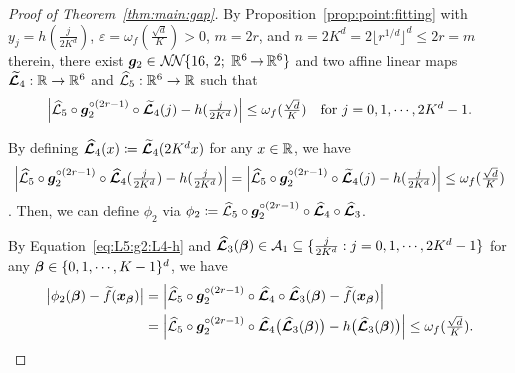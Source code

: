 \documentclass[nohyperref]{article}
\theoremstyle{plain}
\theoremstyle{definition}
\theoremstyle{remark}
\begin{document}
\begin{proof}[Proof of Theorem~\ref{thm:main:gap}]
By Proposition~\ref{prop:point:fitting} with $y_j=h(\tfrac{j}{2K^d})$, $\varepsilon=\omega_f(\tfrac{\sqrt{d}}{K})>0$, $m=2r$, and  $n=2K^d=2\lfloor r^{1/d}\rfloor^d\le 2r=m$ therein, there exist 
$\bmg_2\in\nn{16}{2}{6}{6}$ and two affine linear maps $\bmtildecalL_4:\R\to \R^6$ and $\hatcalL_5:\R^6\to \R$ such that
\begin{equation*}
	\Big|\hatcalL_5\circ \bmg_2^{\circ (2r-1)}\circ \bmtildecalL_4(j)-h(\tfrac{j}{2K^d})\Big|\le \omega_f(\tfrac{\sqrt{d}}{K})\quad  \tn{for } j=0,1,\dotsc,2K^d-1.
\end{equation*}

By defining ${\bm{\mathcal{\widehat{L}}}}_4(x)\coloneqq {\bm{\mathcal{\widetilde{L}}}}_4(2K^dx)$ for any $x\in \R$, we have 
\begin{equation}
	\label{eq:L5:g2:L4-h}
	\begin{split}
		\Big|{\mathcal{\widehat{L}}}_5\circ {\bm{g}}_2^{\circ (2r-1)}\circ {\bm{\mathcal{\widehat{L}}}}_4(\tfrac{j}{2K^d})-h(\tfrac{j}{2K^d})\Big|
		=\Big|{\mathcal{\widehat{L}}}_5\circ {\bm{g}}_2^{\circ (2r-1)}\circ {\bm{\mathcal{\widetilde{L}}}}_4(j)-h(\tfrac{j}{2K^d})\Big|\le \omega_f(\tfrac{\sqrt{d}}{K}) 
	\end{split}
\end{equation}
. Then, we can define $\phi_2$ via  $\phi_2\coloneqq 	{\mathcal{\widehat{L}}}_5\circ {\bm{g}}_2^{\circ (2r-1)}\circ {\bm{\mathcal{\widehat{L}}}}_4\circ {\bm{\mathcal{\widehat{L}}}}_3$. 

By Equation~\eqref{eq:L5:g2:L4-h} and $\bmhatcalL_3(\bmbeta)\in \calA_1\subseteq \{\tfrac{j}{2K^d}:j=0,1,\dotsc,2K^d-1\}$ for any $\bmbeta\in \{0,1,\dotsc,K-1\}^d$, we have
\begin{equation}
	\label{eq:phi2-tildef}
	\begin{split}
		\big|\phi_2({\bm{\beta}})-{\widetilde{f}}({\bm{x}}_{\bm{\beta}})\big|
		&= \Big|{\mathcal{\widehat{L}}}_5\circ {\bm{g}}_2^{\circ (2r-1)}\circ {\bm{\mathcal{\widehat{L}}}}_4\circ {\bm{\mathcal{\widehat{L}}}}_3({\bm{\beta}})- {\widetilde{f}}({\bm{x}}_{\bm{\beta}})\Big|\\
		&= \Big|{\mathcal{\widehat{L}}}_5\circ {\bm{g}}_2^{\circ (2r-1)}\circ {\bm{\mathcal{\widehat{L}}}}_4\big( {\bm{\mathcal{\widehat{L}}}}_3({\bm{\beta}})\big) -h\big({\bm{\mathcal{\widehat{L}}}}_3({\bm{\beta}})\big)\Big|\le \omega_f(\tfrac{\sqrt{d}}{K}).
	\end{split}
\end{equation}




\end{proof}
\end{document}
